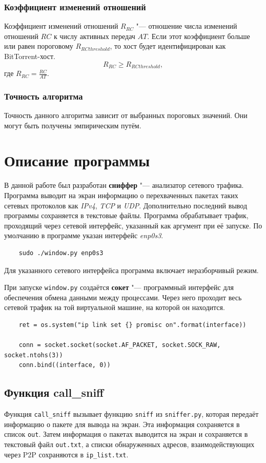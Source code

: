\documentclass[bachelor, och, coursework]{SCWorks}
\begin{document}
\subsubsection{Коэффициент изменений отношений}
Коэффициент изменений отношений $R_{RC}$ "--- отношение числа изменений отношений $RC$ к числу активных передач $AT$.
Если этот коэффициент больше или равен пороговому $R_{RCthreshold}$, то хост будет идентифицирован как BitTorrent-хост.
\[ R_{RC} \geq R_{RCthreshold}, \]
где $R_{RC} = \frac{RC}{AT}$.

\subsubsection{Точность алгоритма}
Точность данного алгоритма зависит от выбранных пороговых значений. Они могут быть получены эмпирическим путём.

\section{Описание программы}
В данной работе был разработан \textbf{сниффер} "--- анализатор сетевого трафика. 
Программа выводит на экран информацию о перехваченных пакетах таких сетевых протоколов как \textit{IPv4}, \textit{TCP} и \textit{UDP}. 
Дополнительно последний вывод программы сохраняется в текстовые файлы. Программа обрабатывает трафик, проходящий через сетевой интерфейс, указанный как аргумент при её запуске. По умолчанию в программе указан интерфейс \textit{enp0s3}.

\begin{verbatim}
    sudo ./window.py enp0s3
\end{verbatim}

Для указанного сетевого интерфейса программа включает неразборчивый режим.

При запуске \texttt{window.py} создаётся \textbf{сокет} "--- программный интерфейс для обеспечения обмена данными между процессами. Через него проходит весь сетевой трафик на той виртуальной машине, на которой он находится. 

\begin{verbatim}
    ret = os.system("ip link set {} promisc on".format(interface))

    conn = socket.socket(socket.AF_PACKET, socket.SOCK_RAW, socket.ntohs(3))
    conn.bind((interface, 0))
\end{verbatim}

\subsection{Функция call_sniff}
Функция \texttt{call_sniff} вызывает функцию \texttt{sniff} из \texttt{sniffer.py}, которая передаёт информацию о пакете для вывода на экран. Эта информация сохраняется в список \texttt{out}. Затем информация о пакетах выводится на экран и сохраняется в текстовый файл \texttt{out.txt}, а списки обнаруженных адресов, взаимодействующих через P2P сохраняются в \texttt{ip_list.txt}.
\end{document}
